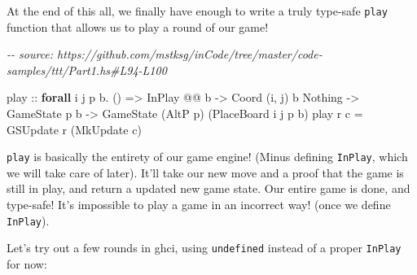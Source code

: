 \documentclass[]{article}
\newenvironment{Shaded}{}{}
\newcommand{\CommentTok}[1]{\textcolor[rgb]{0.38,0.63,0.69}{\textit{#1}}}
\newcommand{\DataTypeTok}[1]{\textcolor[rgb]{0.56,0.13,0.00}{#1}}
\newcommand{\KeywordTok}[1]{\textcolor[rgb]{0.00,0.44,0.13}{\textbf{#1}}}
\newcommand{\NormalTok}[1]{#1}
\newcommand{\OperatorTok}[1]{\textcolor[rgb]{0.40,0.40,0.40}{#1}}
\newcommand{\OtherTok}[1]{\textcolor[rgb]{0.00,0.44,0.13}{#1}}
\begin{document}
At the end of this all, we finally have enough to write a truly type-safe
\texttt{play} function that allows us to play a round of our game!

\begin{Shaded}
\begin{Highlighting}[]
\CommentTok{{-}{-} source: https://github.com/mstksg/inCode/tree/master/code{-}samples/ttt/Part1.hs\#L94{-}L100}

\NormalTok{play}
\OtherTok{    ::} \KeywordTok{forall}\NormalTok{ i j p b}\OperatorTok{.}\NormalTok{ ()}
    \OtherTok{=\textgreater{}} \DataTypeTok{InPlay} \OperatorTok{@@}\NormalTok{ b}
    \OtherTok{{-}\textgreater{}} \DataTypeTok{Coord}\NormalTok{ \textquotesingle{}(i, j) b }\DataTypeTok{\textquotesingle{}Nothing}
    \OtherTok{{-}\textgreater{}} \DataTypeTok{GameState}\NormalTok{ p b}
    \OtherTok{{-}\textgreater{}} \DataTypeTok{GameState}\NormalTok{ (}\DataTypeTok{AltP}\NormalTok{ p) (}\DataTypeTok{PlaceBoard}\NormalTok{ i j p b)}
\NormalTok{play r c }\OtherTok{=} \DataTypeTok{GSUpdate}\NormalTok{ r (}\DataTypeTok{MkUpdate}\NormalTok{ c)}
\end{Highlighting}
\end{Shaded}

\texttt{play} is basically the entirety of our game engine! (Minus defining
\texttt{InPlay}, which we will take care of later). It'll take our new move and
a proof that the game is still in play, and return a updated new game state. Our
entire game is done, and type-safe! It's impossible to play a game in an
incorrect way! (once we define \texttt{InPlay}).

Let's try out a few rounds in ghci, using \texttt{undefined} instead of a proper
\texttt{InPlay} for now:
\end{document}
